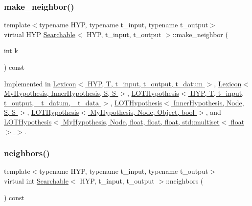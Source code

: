 \mbox{\label{class_searchable_a64bda92cc9314dae7aff31f4444a93e6}} 
\subsubsection{\texorpdfstring{make\+\_\+neighbor()}{make\_neighbor()}}
{\footnotesize\ttfamily template$<$typename H\+YP, typename t\+\_\+input, typename t\+\_\+output$>$ \\
virtual H\+YP \hyperlink{class_searchable}{Searchable}$<$ H\+YP, t\+\_\+input, t\+\_\+output $>$\+::make\+\_\+neighbor (\begin{DoxyParamCaption}\item[{int}]{k }\end{DoxyParamCaption}) const\hspace{0.3cm}{\ttfamily [pure virtual]}}



Implemented in \hyperlink{class_lexicon_a2a5b2b625f4c7477c049c1fd8f0a2e3e}{Lexicon$<$ H\+Y\+P, T, t\+\_\+input, t\+\_\+output, t\+\_\+datum $>$}, \hyperlink{class_lexicon_a2a5b2b625f4c7477c049c1fd8f0a2e3e}{Lexicon$<$ My\+Hypothesis, Inner\+Hypothesis, S, S $>$}, \hyperlink{class_l_o_t_hypothesis_a3460b6ff86b9b964f65c2298bf52b2af}{L\+O\+T\+Hypothesis$<$ H\+Y\+P, T, t\+\_\+input, t\+\_\+output, \+\_\+t\+\_\+datum, \+\_\+t\+\_\+data $>$}, \hyperlink{class_l_o_t_hypothesis_a3460b6ff86b9b964f65c2298bf52b2af}{L\+O\+T\+Hypothesis$<$ Inner\+Hypothesis, Node, S, S $>$}, \hyperlink{class_l_o_t_hypothesis_a3460b6ff86b9b964f65c2298bf52b2af}{L\+O\+T\+Hypothesis$<$ My\+Hypothesis, Node, Object, bool $>$}, and \hyperlink{class_l_o_t_hypothesis_a3460b6ff86b9b964f65c2298bf52b2af}{L\+O\+T\+Hypothesis$<$ My\+Hypothesis, Node, float, float, float, std\+::multiset$<$ float $>$ $>$}.

\mbox{\label{class_searchable_a0450c35a21c5940a63560aa24b4ff0cc}} 
\subsubsection{\texorpdfstring{neighbors()}{neighbors()}}
{\footnotesize\ttfamily template$<$typename H\+YP, typename t\+\_\+input, typename t\+\_\+output$>$ \\
virtual int \hyperlink{class_searchable}{Searchable}$<$ H\+YP, t\+\_\+input, t\+\_\+output $>$\+::neighbors (\begin{DoxyParamCaption}{ }\end{DoxyParamCaption}) const\hspace{0.3cm}{\ttfamily [pure virtual]}}



